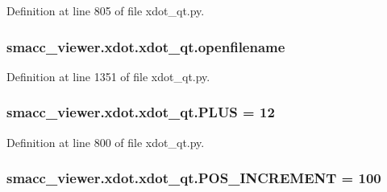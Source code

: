 Definition at line 805 of file xdot\+\_\+qt.\+py.

\subsubsection[{\texorpdfstring{openfilename}{openfilename}}]{\setlength{\rightskip}{0pt plus 5cm}smacc\+\_\+viewer.\+xdot.\+xdot\+\_\+qt.\+openfilename}\hypertarget{namespacesmacc__viewer_1_1xdot_1_1xdot__qt_adf013ec6582a49cdc769f0c185819576}{}\label{namespacesmacc__viewer_1_1xdot_1_1xdot__qt_adf013ec6582a49cdc769f0c185819576}


Definition at line 1351 of file xdot\+\_\+qt.\+py.

\subsubsection[{\texorpdfstring{P\+L\+US}{PLUS}}]{ smacc\+\_\+viewer.\+xdot.\+xdot\+\_\+qt.\+P\+L\+US = 12}\hypertarget{namespacesmacc__viewer_1_1xdot_1_1xdot__qt_a8b8e5a4bd6d9a07549b40fd222cf15b2}{}\label{namespacesmacc__viewer_1_1xdot_1_1xdot__qt_a8b8e5a4bd6d9a07549b40fd222cf15b2}


Definition at line 800 of file xdot\+\_\+qt.\+py.

\subsubsection[{\texorpdfstring{P\+O\+S\+\_\+\+I\+N\+C\+R\+E\+M\+E\+NT}{POS_INCREMENT}}]{ smacc\+\_\+viewer.\+xdot.\+xdot\+\_\+qt.\+P\+O\+S\+\_\+\+I\+N\+C\+R\+E\+M\+E\+NT = 100}\hypertarget{namespacesmacc__viewer_1_1xdot_1_1xdot__qt_ac9afe7a4efc515b9800786f0fe13e131}{}\label{namespacesmacc__viewer_1_1xdot_1_1xdot__qt_ac9afe7a4efc515b9800786f0fe13e131}


